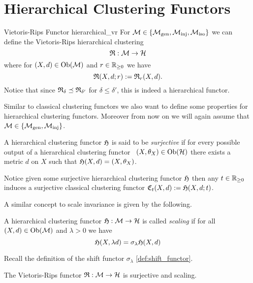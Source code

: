 \chapter{Hierarchical Clustering Functors}
\label{chapter__hierarchical}

\begin{definition}{Vietoris-Rips Functor \cite[Ex.~7.1]{Carlsson2010}}{hierarchical_vr}
For $\mathcal{M} \in \{{\mathcal{M}_\mathrm{gen}},{\mathcal{M}_\mathrm{inj}},{\mathcal{M}_\mathrm{iso}}\}$ we can define the Vietoris-Rips hierarchical clustering
$$
\mathfrak{R}: \mathcal{M} \to \mathcal{H}
$$
where for $(X,d) \in \mathrm {Ob}(\mathcal{M})$ and $r \in \mathbb R_{\geq0}$ we have
$$
\mathfrak{R}(X,d; r) := \mathfrak{R}_r(X,d).
$$
Notice that since $\mathfrak{R}_\delta \preceq \mathfrak{R}_{\delta'}$ for $\delta \leq \delta'$, this is indeed a hierarchical functor.
\end{definition}

Similar to classical clustering functors we also want to define some properties for hierarchical clustering functors. Moreover from now on we will again assume that $\mathcal{M} \in \{{\mathcal{M}_\mathrm{gen}}, {\mathcal{M}_\mathrm{inj}}\}$.

\begin{definition}{}{}
    A hierarchical clustering functor $\mathfrak{H}$ is said to be \emph{surjective} if for every possible output of a hierarchical clustering functor \ie\ $(X, \theta_X) \in \mathrm {Ob}(\mathcal{H})$ there exists a metric $d$ on $X$ such that $\mathfrak{H}(X,d) = (X, \theta_X)$.
\end{definition}

Notice given some surjective hierarchical clustering functor $\mathfrak{H}$ then any $t \in \mathbb R_{\geq0}$ induces a surjective classical clustering functor $\mathfrak{C}_t(X,d) := \mathfrak{H}(X, d; t)$.

 
A similar concept to scale invariance is given by the following.

\begin{definition}{}{}
A hierarchical clustering functor $\mathfrak{H}: \mathcal{M} \to \mathcal{H}$ is called \emph{scaling} if for all $(X,d) \in \mathrm {Ob}(\mathcal{M})$ and $\lambda > 0$ we have
$$
\mathfrak{H}(X, \lambda d) = \sigma_\lambda \mathfrak{H}(X,d)
$$
\end{definition}
Recall the definition of the shift functor $\sigma_\lambda$ \ref{def:shift_functor}.

\begin{proposition}{\cite[Sec.~7.3.1]{Carlsson2010}}{}
The Vietoris-Rips functor $\mathfrak{R}: \mathcal{M} \to \mathcal{H}$ is surjective and scaling.
\end{proposition}

